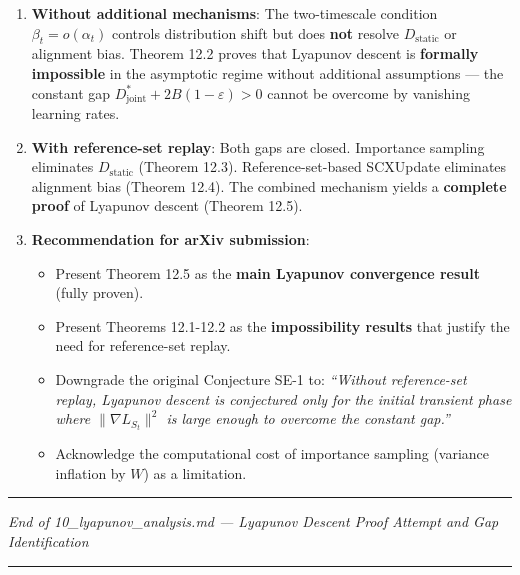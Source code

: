 \documentclass[
  12pt,
]{ctexart}
\providecommand{\tightlist}{%
  \setlength{\itemsep}{0pt}\setlength{\parskip}{0pt}}
\begin{document}
\begin{enumerate}
\def\labelenumi{\arabic{enumi}.}
\item
  \textbf{Without additional mechanisms}: The two-timescale condition
  \(\beta_t = o(\alpha_t)\) controls distribution shift but does
  \textbf{not} resolve \(D_{\text{static}}\) or alignment bias. Theorem
  12.2 proves that Lyapunov descent is \textbf{formally impossible} in
  the asymptotic regime without additional assumptions --- the constant
  gap \(D_{\text{joint}}^* + 2B(1-\varepsilon) > 0\) cannot be overcome
  by vanishing learning rates.
\item
  \textbf{With reference-set replay}: Both gaps are closed. Importance
  sampling eliminates \(D_{\text{static}}\) (Theorem 12.3).
  Reference-set-based SCXUpdate eliminates alignment bias (Theorem
  12.4). The combined mechanism yields a \textbf{complete proof} of
  Lyapunov descent (Theorem 12.5).
\item
  \textbf{Recommendation for arXiv submission}:

  \begin{itemize}
  \tightlist
  \item
    Present Theorem 12.5 as the \textbf{main Lyapunov convergence
    result} (fully proven).
  \item
    Present Theorems 12.1-12.2 as the \textbf{impossibility results}
    that justify the need for reference-set replay.
  \item
    Downgrade the original Conjecture SE-1 to: \emph{``Without
    reference-set replay, Lyapunov descent is conjectured only for the
    initial transient phase where \(\|\nabla L_{S_t}\|^2\) is large
    enough to overcome the constant gap.''}
  \item
    Acknowledge the computational cost of importance sampling (variance
    inflation by \(W\)) as a limitation.
  \end{itemize}
\end{enumerate}

\begin{center}\rule{0.5\linewidth}{0.5pt}\end{center}

\emph{End of 10\_lyapunov\_analysis.md --- Lyapunov Descent Proof
Attempt and Gap Identification}

\begin{center}\rule{0.5\linewidth}{0.5pt}\end{center}
\end{document}
